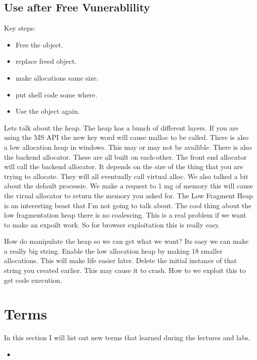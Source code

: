 \documentclass[letterpaper, onecolumn,10pt]{IEEEtran}
\begin{document}
		   \subsection{Use after Free Vunerablility}
		   Key steps:
		   \begin{itemize}
		       \item Free the object.\\
		       \item replace freed object.\\
		       \item make allocations same size.\\
		       \item put shell code some where.\\
		       \item Use the object again.\\
		   \end{itemize}
		   Lets talk about the heap. The heap has a bunch of different layers. If you are using the MS API the new key word will cause malloc to be called. There is also a low allocation heap in windows. This may or may not be availible. There is also the backend allocator. These are all built on each-other. The front end allocator will call the backend allocator. It depends on the size of the thing that you are trying to allocate. They will all eventually call virtual alloc. We also talked a bit about the default processie. We make a request to 1 mg of memory this will cause the virual allocator to return the memory you asked for. The Low Fragment Heap is an interesting beast that I'm not going to talk about. The cool thing about the low fragmentation heap there is no coalescing. This is a real problem if we want to make an expoilt work. So for browser exploitation this is really easy. 
		   
		   How do manipulate the heap so we can get what we want? Its easy we can make a really big string. Enable the low allocation heap by making 18 smaller allocations. This will make life easier later. Delete the initial instance of that string you created earlier. This may cause it to crash. How to we exploit this to get code execution.\\
		    
		
		
		\section{Terms}
		In this section I will list out new terms that learned during the lectures and labs.
		\begin{itemize}
		    \item 
		\end{itemize}
			
		
\end{document}
